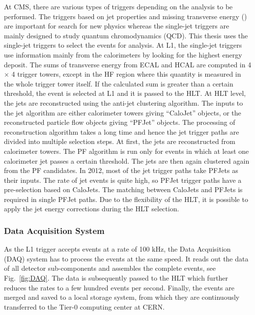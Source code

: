 At CMS, there are various types of triggers depending on the analysis to be performed. The triggers based on jet properties and missing transverse energy (\ETmiss) are important for search for new physics whereas the single-jet triggers are mainly designed to study quantum chromodynamics (QCD). This thesis uses the single-jet triggers to select the events for analysis. At L1, the single-jet triggers use information mainly from the calorimeters by looking for the highest energy deposit. The sums of transverse energy from ECAL and HCAL are computed in 4 $\times$ 4 trigger towers, except in the HF region where this quantity is measured in the whole trigger tower itself. If the calculated sum is greater than a certain threshold, the event is selected at L1 and it is passed to the HLT. At HLT level, the jets are reconstructed using the anti-\kt jet clustering algorithm. The inputs to the jet algorithm are either calorimeter towers giving ``CaloJet'' objects, or the reconstructed particle flow objects giving ``PFJet'' objects. The processing of reconstruction algorithm takes a long time and hence the jet trigger paths are divided into multiple selection steps. At first, the jets are reconstructed from calorimeter towers. The PF algorithm is run only for events in which at least one calorimeter jet passes a certain \pt threshold. The jets are then again clustered again from the PF candidates. In 2012, most of the jet trigger paths take PFJets as their inputs. The rate of jet events is quite high, so PFJet trigger paths have a pre-selection based on CaloJets. The matching between CaloJets and PFJets is required in single PFJet paths. Due to the flexibility of the HLT, it is possible to apply the jet energy corrections during the HLT selection.

\subsubsection{Data Acquisition System}
As the L1 trigger accepts events at a rate of 100 kHz, the Data Acquisition (DAQ) system has to process the events at the same speed. It reads out the data of all detector sub-components and assembles the complete events, see Fig.~\ref{fig:DAQ}. The data is subsequently passed to the HLT which further reduces the rates to a few hundred events per second. Finally, the events are merged and saved to a local storage system, from which they are continuously transferred to the Tier-0 computing center at CERN.

